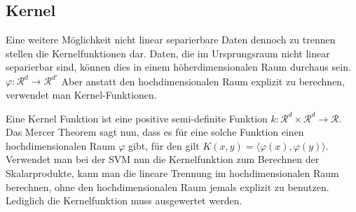 \documentclass[ngerman]{scrartcl}
\begin{document}
\subsection{Kernel}
Eine weitere Möglichkeit nicht linear separierbare Daten dennoch zu trennen stellen die Kernelfunktionen dar.
Daten, die im Ursprungsraum nicht linear separierbar sind, können dies in einem höherdimensionalen Raum durchaus sein. $\varphi : \mathcal R^d \rightarrow \mathcal R^{d'}$
Aber anstatt den hochdimensionalen Raum explizit zu berechnen, verwendet man Kernel-Funktionen.
 
Eine Kernel Funktion ist eine positive semi-definite Funktion $k: \mathcal R^d \times \mathcal R^d \rightarrow \mathcal R$.
Das Mercer Theorem sagt nun, dass es für eine solche Funktion einen hochdimensionalen Raum $\varphi$ gibt, für den gilt $K(x,y) = \langle \varphi(x), \varphi(y) \rangle$.
Verwendet man bei der SVM nun die Kernelfunktion zum Berechnen der Skalarprodukte, kann man die lineare Trennung im hochdimensionalen Raum berechnen, ohne den hochdimensionalen Raum jemals explizit zu benutzen.  Lediglich die Kernelfunktion muss ausgewertet werden.
\end{document}

